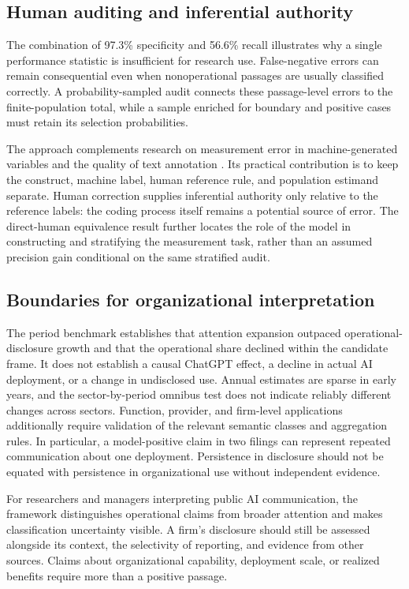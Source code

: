 \documentclass[12pt]{article}
\begin{document}
\subsection{Human auditing and inferential authority}

The combination of 97.3\% specificity and 56.6\% recall illustrates why a
single performance statistic is insufficient for research use. False-negative
errors can remain consequential even when nonoperational passages are
usually classified correctly. A probability-sampled audit connects these
passage-level errors to the finite-population total, while a sample enriched
for boundary and positive cases must retain its selection probabilities.

The approach complements research on measurement error in machine-generated
variables \citep{qiao2025measurement} and the quality of text annotation
\citep{mousavi2026psychometric}. Its practical contribution is to keep the
construct, machine label, human reference rule, and population estimand
separate. Human correction supplies inferential authority only relative to
the reference labels: the coding process itself remains a potential source
of error. The direct-human equivalence result further locates the role of the
model in constructing and stratifying the measurement task, rather than an
assumed precision gain conditional on the same stratified audit.

\subsection{Boundaries for organizational interpretation}

The period benchmark establishes that attention expansion outpaced
operational-disclosure growth and that the operational share declined within
the candidate frame. It does not establish a causal ChatGPT effect, a decline
in actual AI deployment, or a change in undisclosed use. Annual estimates are
sparse in early years, and the sector-by-period omnibus test does not indicate
reliably different changes across sectors. Function, provider, and firm-level applications additionally require
validation of the relevant semantic classes and aggregation rules. In
particular, a model-positive claim in two filings can represent repeated
communication about one deployment. Persistence in disclosure should not be
equated with persistence in organizational use without independent evidence.

For researchers and managers interpreting public AI communication, the
framework distinguishes operational claims from broader attention and makes
classification uncertainty visible. A firm's disclosure should still be
assessed alongside its context, the selectivity of reporting, and evidence
from other sources. Claims about organizational capability, deployment scale,
or realized benefits require more than a positive passage.
\end{document}
